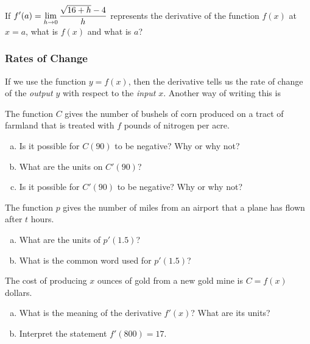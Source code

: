 \documentclass[notes]{subfiles}
\begin{document}
		\begin{ex}
			If $\displaystyle f'(a) = \lim_{h\to 0} \dfrac{\sqrt{16 + h} - 4}{h}$ represents the derivative of the function $f(x)$ at $x = a$, what is $f(x)$ and what is $a$?
		\end{ex}
			
	\subsubsection*{Rates of Change}
		If we use the function $y = f(x)$, then the derivative tells us the rate of change of the \emph{output} $y$ with respect to the \emph{input} $x$.  Another way of writing this is
			
		\begin{ex}
			The function $C$ gives the number of bushels of corn produced on a tract of farmland that is treated with $f$ pounds of nitrogen per acre.
			\begin{enumerate}[(a)]
				\item Is it possible for $C(90)$ to be negative?  Why or why not?
					\newpage
					
				\item What are the units on $C'(90)$?

				\item Is it possible for $C'(90)$ to be negative?  Why or why not?
			\end{enumerate}
		\end{ex}
			
		\begin{ex}
			The function $p$ gives the number of miles from an airport that a plane has flown after $t$ hours.
			\begin{enumerate}[(a)]
				\item What are the units of $p'(1.5)$?
					\vs{1}

				\item What is the common word used for $p'(1.5)$?
					\vs{1}
			\end{enumerate}
		\end{ex}

		\begin{ex}
			The cost of producing $x$ ounces of gold from a new gold mine is $C=f(x)$ dollars.
			\begin{enumerate}[(a)]
				\item What is the meaning of the derivative $f'(x)$?  What are its units?
				\item Interpret the statement $f'(800) = 17$.
			\end{enumerate}
		\end{ex}
			\newpage
			
\end{document}
